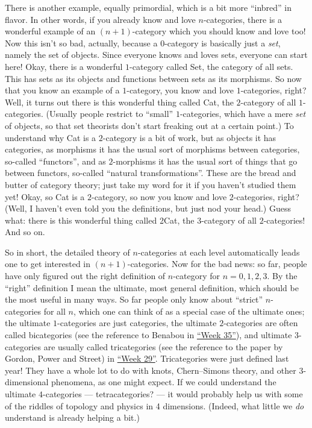 \documentclass{article}
\begin{document}
There is another example, equally primordial, which is a bit more
``inbred'' in flavor. In other words, if you already know and love
\(n\)-categories, there is a wonderful example of an \((n+1)\)-category
which you should know and love too! Now this isn't so bad, actually,
because a 0-category is basically just a \emph{set}, namely the set of
objects. Since everyone knows and loves sets, everyone can start here!
Okay, there is a wonderful \(1\)-category called Set, the category of
all sets. This has sets as its objects and functions between sets as its
morphisms. So now that you know an example of a \(1\)-category, you know
and love \(1\)-categories, right? Well, it turns out there is this
wonderful thing called Cat, the \(2\)-category of all \(1\)-categories.
(Usually people restrict to ``small'' \(1\)-categories, which have a
mere \emph{set} of objects, so that set theorists don't start freaking
out at a certain point.) To understand why Cat is a \(2\)-category is a
bit of work, but as objects it has categories, as morphisms it has the
usual sort of morphisms between categories, so-called ``functors'', and
as \(2\)-morphisms it has the usual sort of things that go between
functors, so-called ``natural transformations''. These are the bread and
butter of category theory; just take my word for it if you haven't
studied them yet! Okay, so Cat is a \(2\)-category, so now you know and
love \(2\)-categories, right? (Well, I haven't even told you the
definitions, but just nod your head.) Guess what: there is this
wonderful thing called 2Cat, the \(3\)-category of all \(2\)-categories!
And so on.

So in short, the detailed theory of \(n\)-categories at each level
automatically leads one to get interested in \((n+1)\)-categories. Now
for the bad news: so far, people have only figured out the right
definition of \(n\)-category for \(n = 0, 1, 2, 3\). By the ``right''
definition I mean the ultimate, most general definition, which should be
the most useful in many ways. So far people only know about ``strict''
\(n\)-categories for all \(n\), which one can think of as a special case
of the ultimate ones; the ultimate \(1\)-categories are just categories,
the ultimate \(2\)-categories are often called bicategories (see the
reference to Benabou in \protect\hyperlink{week35}{``Week 35''}), and
ultimate \(3\)-categories are usually called tricategories (see the
reference to the paper by Gordon, Power and Street) in
\protect\hyperlink{week29}{``Week 29''}. Tricategories were just defined
last year! They have a whole lot to do with knots, Chern--Simons theory,
and other \(3\)-dimensional phenomena, as one might expect. If we could
understand the ultimate \(4\)-categories --- tetracategories? --- it
would probably help us with some of the riddles of topology and physics
in 4 dimensions. (Indeed, what little we \emph{do} understand is already
helping a bit.)
\end{document}
